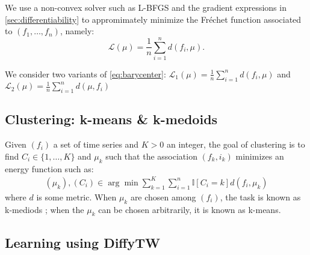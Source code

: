 We use a non-convex solver such as L-BFGS and the gradient expressions in \cref{sec:differentiability} to appromimately minimize the Fréchet function associated to $(f_1, \ldots, f_n)$, namely:
\begin{equation}\label{eq:barycenter}
    \mathcal L(\mu) = \frac{1}{n}\sum_{i=1}^n d(f_i, \mu).
\end{equation}

We consider two variants of \cref{eq:barycenter}: $\mathcal L_1(\mu) = \frac{1}{n}\sum_{i=1}^n d(f_i,\mu)$ and $\mathcal L_2(\mu) = \frac{1}{n}\sum_{i=1}^n d(\mu, f_i)$



\subsection{Clustering: k-means \& k-medoids}

Given $(f_i)$ a set of time series and $K > 0$ an integer, the goal of clustering is to find $C_i \in \lbrace 1, \ldots, K\rbrace$ and $\mu_k$ such that the association $(f_k, i_k)$ minimizes an energy function such as:
\begin{align}
    (\mu_k), (C_i) \in \arg\min \sum_{k=1}^K\sum_{i=1}^n \mathbb I[C_i = k]d(f_i, \mu_k)
\end{align}
where $d$ is some metric. When $\mu_k$ are chosen among $(f_i)$, the task is known as k-mediods ; when the $\mu_k$ can be chosen arbitrarily, it is known as k-means.

\subsection{Learning using DiffyTW}
